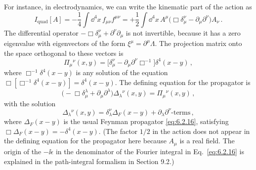 For instance, in electrodynamics, we can write the kinematic part of the
action as
\[
  I_{\mathrm{quad}}[A]
  =-\frac14\int \dd^4x\,f_{\mu\nu}f^{\mu\nu}
  =+\frac12\int \dd^4x\,
    A^\mu\bigl(\Box\delta_\mu^\nu-\partial_\mu\partial^\nu\bigr)A_\nu\,.
\]
The differential operator
\(-\Box\delta_\mu^\nu+\partial^\nu\partial_\mu\) is not invertible, because
it has a zero eigenvalue with eigenvectors of the form
\(\xi^\mu=\partial^\mu\Lambda\). The projection matrix onto the space
orthogonal to these vectors is
\[
  \Pi_\mu{}^\nu(x,y)
  =\bigl[\delta_\mu^\nu-\partial_\mu\partial^\nu\Box^{-1}\bigr]
    \delta^4(x-y)\,,
\]
where \(\Box^{-1}\delta^4(x-y)\) is any solution of the equation
\(\Box[\Box^{-1}\delta^4(x-y)]=\delta^4(x-y)\). The defining equation for
the propagator is
\[
  \bigl(-\Box\delta_\mu^\lambda+\partial_\mu\partial^\lambda\bigr)
  \Delta_\lambda{}^\nu(x,y)
  =\Pi_\mu{}^\nu(x,y)\,,
\]
with the solution
\[
  \Delta_\lambda{}^\nu(x,y)
  =\delta_\lambda^\nu\Delta_F(x-y)
   +\partial_\lambda\partial^\nu\text{-terms}\,,
\]
where \(\Delta_F(x-y)\) is the usual Feynman propagator
\eqref{eq:6.2.16}, satisfying
\(\Box\Delta_F(x-y)=-\delta^4(x-y)\). (The factor \(1/2\) in the action
does not appear in the defining equation for the propagator here because
\(A_\mu\) is a real field. The origin of the \(-\ii\epsilon\) in the
denominator of the Fourier integral in Eq.~\eqref{eq:6.2.16} is explained
in the path-integral formalism in Section 9.2.)

